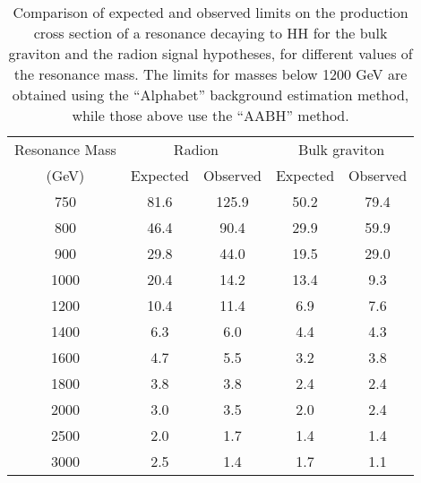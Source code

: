 \begin{table}
  \begin{center}
    \begin{tabular}{c|c|c|c|c}
      \hline\hline
      Resonance Mass & \multicolumn{2}{c|}{Radion} & \multicolumn{2}{c}{Bulk graviton} \\ \cline{2-5}
      (GeV)          & Expected & Observed & Expected & Observed \\
      \hline\hline
      750  & 81.6 & 125.9 & 50.2 & 79.4\\
      800  & 46.4 & 90.4  & 29.9 & 59.9\\
      900  & 29.8 & 44.0  & 19.5 & 29.0\\
      1000 & 20.4 & 14.2  & 13.4 & 9.3 \\
      1200 & 10.4 & 11.4  & 6.9  & 7.6 \\
      1400 & 6.3  & 6.0   & 4.4  & 4.3 \\
      1600 & 4.7  & 5.5   & 3.2  & 3.8 \\
      1800 & 3.8  & 3.8   & 2.4  & 2.4 \\
      2000 & 3.0  & 3.5   & 2.0  & 2.4 \\
      2500 & 2.0  & 1.7   & 1.4  & 1.4 \\
      3000 & 2.5  & 1.4   & 1.7  & 1.1 \\
      \hline\hline
    \end{tabular}
    \caption{Comparison of expected and observed limits on the production cross section of a resonance decaying to $\mathrm{HH}$ for the bulk graviton and the radion signal hypotheses, for different values of the resonance mass. The limits for masses below 1200 GeV are obtained using the ``Alphabet'' background estimation method, while those above use the ``AABH'' method.}\label{tab:limits}
  \end{center}
\end{table}


































